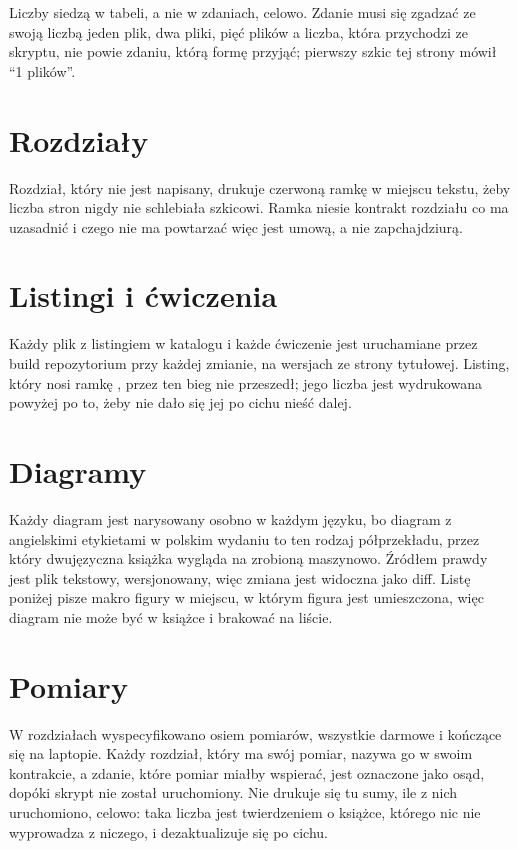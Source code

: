 \noindent
Liczby siedzą w tabeli, a nie w zdaniach, celowo. Zdanie musi się zgadzać ze
swoją liczbą \dash{} jeden plik, dwa pliki, pięć plików \dash{} a liczba, która
przychodzi ze skryptu, nie powie zdaniu, którą formę przyjąć; pierwszy szkic
tej strony mówił \enquote{1 plików}.

\section{Rozdziały}
\label{sec:E-chapters}

Rozdział, który nie jest napisany, drukuje czerwoną ramkę
\emph{\lblNotWritten} w miejscu tekstu, żeby liczba stron nigdy nie schlebiała
szkicowi. Ramka niesie kontrakt rozdziału \dash{} co ma uzasadnić i czego nie
ma powtarzać \dash{} więc jest umową, a nie zapchajdziurą.

\section{Listingi i ćwiczenia}
\label{sec:E-listings}

Każdy plik z listingiem w katalogu  i każde ćwiczenie jest
uruchamiane przez build repozytorium przy każdej zmianie, na wersjach ze
strony tytułowej. Listing, który nosi ramkę \emph{\lblVerify}, przez ten bieg
nie przeszedł; jego liczba jest wydrukowana powyżej po to, żeby nie dało się
jej po cichu nieść dalej.

\listofexercises

\section{Diagramy}
\label{sec:E-diagrams}

Każdy diagram jest narysowany osobno w każdym języku, bo diagram z
angielskimi etykietami w polskim wydaniu to ten rodzaj półprzekładu, przez
który dwujęzyczna książka wygląda na zrobioną maszynowo. Źródłem prawdy jest
plik tekstowy, wersjonowany, więc zmiana jest widoczna jako diff. Listę
poniżej pisze makro figury w miejscu, w którym figura jest umieszczona, więc
diagram nie może być w książce i brakować na liście.

\listofdiagrams

\section{Pomiary}
\label{sec:E-measurements}

W rozdziałach wyspecyfikowano osiem pomiarów, wszystkie darmowe i kończące
się na laptopie. Każdy rozdział, który ma swój pomiar, nazywa go w swoim
kontrakcie, a zdanie, które pomiar miałby wspierać, jest oznaczone jako osąd,
dopóki skrypt nie został uruchomiony. Nie drukuje się tu sumy, ile z nich
uruchomiono, celowo: taka liczba jest twierdzeniem o książce, którego nic nie
wyprowadza z niczego, i dezaktualizuje się po cichu.
